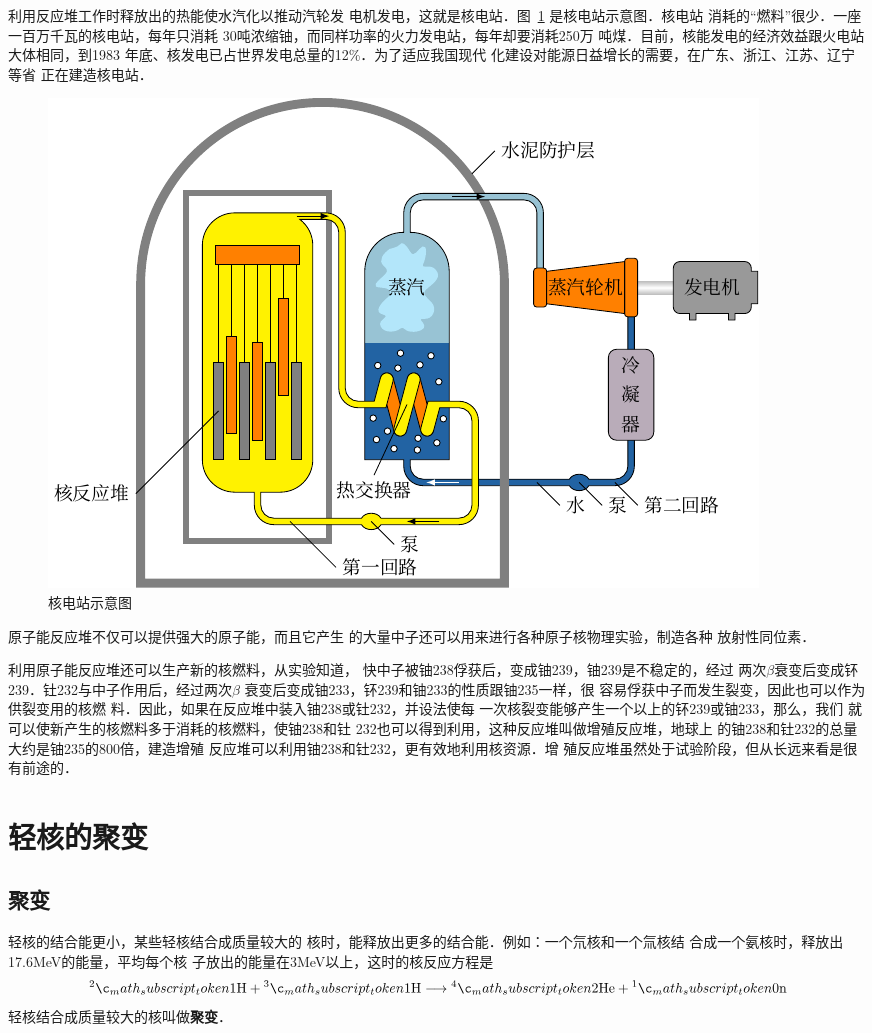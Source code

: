 利用反应堆工作时释放出的热能使水汽化以推动汽轮发
电机发电，这就是核电站．图~\ref{fig_C_9-15} 是核电站示意图．核电站
消耗的“燃料”很少．一座一百万千瓦的核电站，每年只消耗
30吨浓缩铀，而同样功率的火力发电站，每年却要消耗250万
吨煤．目前，核能发电的经济效益跟火电站大体相同，到1983
年底、核发电已占世界发电总量的12\%．为了适应我国现代
化建设对能源日益增长的需要，在广东、浙江、江苏、辽宁等省
正在建造核电站．

\begin{figure}[htbp]
    \centering
    \includegraphics{fig/C/9-15.pdf}
    \caption{核电站示意图}\label{fig_C_9-15}
\end{figure}

原子能反应堆不仅可以提供强大的原子能，而且它产生
的大量中子还可以用来进行各种原子核物理实验，制造各种
放射性同位素．

利用原子能反应堆还可以生产新的核燃料，从实验知道，
快中子被铀238俘获后，变成铀239，铀239是不稳定的，经过
两次$\beta$衰变后变成钚239．钍232与中子作用后，经过两次$\beta$
衰变后变成铀233，钚239和铀233的性质跟铀235一样，很
容易俘获中子而发生裂变，因此也可以作为供裂变用的核燃
料．因此，如果在反应堆中装入铀238或钍232，并设法使每
一次核裂变能够产生一个以上的钚239或铀233，那么，我们
就可以使新产生的核燃料多于消耗的核燃料，使铀238和钍
232也可以得到利用，这种反应堆叫做增殖反应堆，地球上
的铀238和钍232的总量大约是铀235的800倍，建造增殖
反应堆可以利用铀238和钍232，更有效地利用核资源．增
殖反应堆虽然处于试验阶段，但从长远来看是很有前途的．

\section{轻核的聚变}
\subsection{聚变}
轻核的结合能更小，某些轻核结合成质量较大的
核时，能释放出更多的结合能．例如：一个氘核和一个氚核结
合成一个氨核时，释放出17.6MeV的能量，平均每个核
子放出的能量在3MeV以上，这时的核反应方程是
\[\atom{H}{2}{1}+\atom{H}{3}{1}\longrightarrow \atom{He}{4}{2}+\atom{n}{1}{0} 
    \]
轻核结合成质量较大的核叫做\textbf{聚变}．

